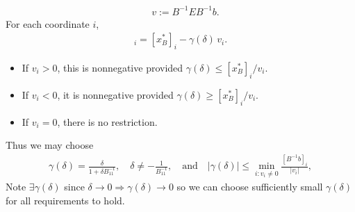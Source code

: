 \documentclass[11pt]{exam}
\begin{document}
\begin{questions}
\begin{parts}
\begin{subparts}
\begin{align*}
            \quad
            v := B^{-1}E B^{-1}b.
          \end{align*}
          For each coordinate $i$,
          \begin{align*}
            [x_B(\delta)]_i
            = [x_B^*]_i - \gamma(\delta)\, v_i.
          \end{align*}
          \begin{itemize}
            \item If $v_i > 0$, this is nonnegative provided
            $\gamma(\delta) \le [x_B^*]_i / v_i$.
            \item If $v_i < 0$, it is nonnegative provided
            $\gamma(\delta) \ge [x_B^*]_i / v_i$.
            \item If $v_i = 0$, there is no restriction.
          \end{itemize}
          Thus we may choose
          \begin{align*}
            \gamma(\delta) = \frac{\delta}{1 + \delta B^{-1}_{11}}, 
            \quad \delta \neq -\frac{1}{B^{-1}_{11}},
            \quad\text{and}\quad 
            |\gamma(\delta)| \le \min_{i:v_i\neq0} \frac{[B^{-1}b]_i}{|v_i|},
          \end{align*}
          Note $\exists \gamma(\delta)$ since $\delta \rightarrow 0 \Longrightarrow \gamma(\delta) \rightarrow 0$ so we can choose sufficiently small $\gamma(\delta)$ for all requirements to hold. 


\end{subparts}
\end{parts}
\end{questions}
\end{document}
